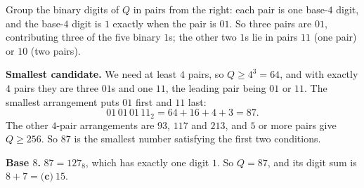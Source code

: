 Group the binary digits of $Q$ in pairs from the right: each pair is one base-$4$ digit, and the base-$4$ digit is $1$ exactly when the pair is $01$. So three pairs are $01$, contributing three of the five binary $1$s; the other two $1$s lie in pairs $11$ (one pair) or $10$ (two pairs).

\textbf{Smallest candidate.} We need at least $4$ pairs, so $Q\ge4^3=64$, and with exactly $4$ pairs they are three $01$s and one $11$, the leading pair being $01$ or $11$. The smallest arrangement puts $01$ first and $11$ last:
\[
01\,01\,01\,11_2=64+16+4+3=87 .
\]
The other $4$-pair arrangements are $93$, $117$ and $213$, and $5$ or more pairs give $Q\ge256$. So $87$ is the smallest number satisfying the first two conditions.

\textbf{Base $8$.} $87=127_8$, which has exactly one digit $1$. So $Q=87$, and its digit sum is $8+7=\boxed{\textbf{(c)}\ 15}$.
